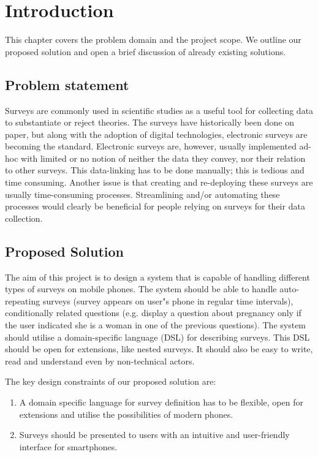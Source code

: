 \chapter{Introduction}
\label{chap:introduction}
This chapter covers the problem domain and the project scope. We outline our proposed solution and open a brief discussion of already existing solutions.

\section{Problem statement}
\label{sec:problemstatement}
Surveys are commonly used in scientific studies as a useful tool for collecting data to substantiate or reject theories. The surveys have historically been done on paper, but along with the adoption of digital technologies, electronic surveys are becoming the standard.
Electronic surveys are, however, usually implemented ad-hoc with limited or no notion of neither the data they convey, nor their relation to other surveys. This data-linking has to be done manually; this is tedious and time consuming. Another issue is that creating and re-deploying these surveys are usually time-consuming processes.
Streamlining and/or automating these processes would clearly be beneficial for people relying on surveys for their data collection.

\section{Proposed Solution}
\label{sec:proposedsolution}
The aim of this project is to design a system that is capable of handling different types of surveys on mobile phones. The system should be able to handle auto-repeating surveys (survey appears on user"s phone in regular time intervals), conditionally related questions (e.g. display a question about pregnancy only if the user indicated she is a woman in one of the previous questions).
The system should utilise a domain-specific language (DSL) for describing surveys. This DSL should be open for extensions, like nested surveys. It should also be easy to write, read and understand even by non-technical actors.

The key design constraints of our proposed solution are:

\begin{enumerate}
  \item A domain specific language for survey definition has to be flexible, open for extensions and utilise the possibilities of modern phones.
  \item Surveys should be presented to users with an intuitive and user-friendly interface for smartphones.
\end{enumerate}

